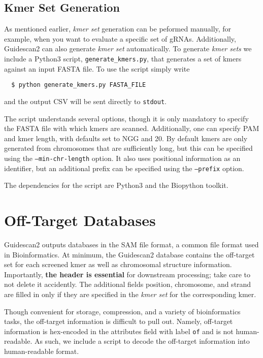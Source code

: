 \documentclass[11pt]{article}
\begin{document}
\subsection{Kmer Set Generation}
As mentioned earlier, {\it kmer set} generation can be peformed manually,
for example, when you want to evaluate a specific set of gRNAs.
Additionally, Guidescan2 can also generate {\it kmer set} automatically.
To generate {\it kmer sets} we include a Python3 script,
\texttt{generate\_kmers.py}, that generates a set of kmers against an
input FASTA file. To use the script simply write
\begin{verbatim}
  $ python generate_kmers.py FASTA_FILE 
\end{verbatim}
and the output CSV will be sent directly to \texttt{stdout}.

The script understands several options, though it is only mandatory to
specify the FASTA file with which kmers are scanned. Additionally, one
can specify PAM and kmer length, with defaults set to NGG and 20. By
default kmers are only generated from chromosomes that are
sufficiently long, but this can be specified using the
\texttt{--min-chr-length} option. It also uses positional information
as an identifier, but an additional prefix can be specified using the
\texttt{--prefix} option.

The dependencies for the script are Python3 and the Biopython toolkit.

\section{Off-Target Databases}
Guidescan2 outputs databases in the SAM file format, a common file
format used in Bioinformatics. At minimum, the Guidescan2 database
contains the off-target set for each screened kmer as well as
chromosomal structure information. Importantly, \textbf{the header is
  essential} for downstream processing; take care to not delete it
accidently. The additional fields position, chromosome, and strand are
filled in only if they are specified in the {\it kmer set} for the
corresponding kmer. 

Though convenient for storage, compression, and a variety of
bioinformatics tasks, the off-target information is difficult to pull
out. Namely, off-target information is hex-encoded in the attributes
field with label \texttt{of} and is not human-readable. As such, we
include a script to decode the off-target information into
human-readable format.
\end{document}

